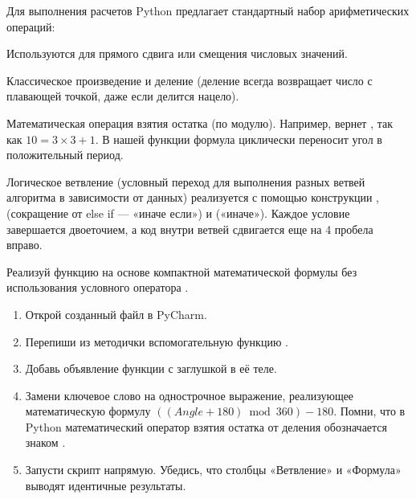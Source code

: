 Для выполнения расчетов Python предлагает стандартный набор арифметических операций:
\begin{syntaxdesc}
    \item[Сложение и вычитание (строки 11, 28, 33) \mycode{+} и \mycode{-}] Используются для прямого сдвига или смещения числовых значений.
    \item[Умножение и деление (строки 7, 33) \mycode{*} и \mycode{/}] Классическое произведение и деление (деление всегда возвращает число с плавающей точкой, даже если делится нацело).
    \item[Остаток от деления (строка 7) \mycode{\%}] Математическая операция взятия остатка (по модулю). Например,  вернет , так как $10 = 3 \times 3 + 1$. В нашей функции формула  циклически переносит угол в положительный период.
\end{syntaxdesc}

Логическое ветвление (условный переход для выполнения разных ветвей алгоритма в зависимости от данных) реализуется с помощью конструкции ,  (сокращение от else if — «иначе если») и  («иначе»). Каждое условие завершается двоеточием, а код внутри ветвей сдвигается еще на 4 пробела вправо.

\begin{minitaskbox}
	Реализуй функцию  на основе компактной математической формулы без использования условного оператора .
	
	\begin{enumerate}
		\item Открой созданный файл  в PyCharm.
		\item Перепиши из методички вспомогательную функцию .
		\item Добавь объявление функции  с заглушкой  в её теле.
		\item Замени ключевое слово  на однострочное выражение, реализующее математическую формулу $((Angle + 180) \bmod 360) - 180$. Помни, что в Python математический оператор взятия остатка от деления обозначается знаком \mycode{\%}.
		\item Запусти скрипт  напрямую. Убедись, что столбцы «Ветвление» и «Формула» выводят идентичные результаты.
	\end{enumerate}
\end{minitaskbox}

